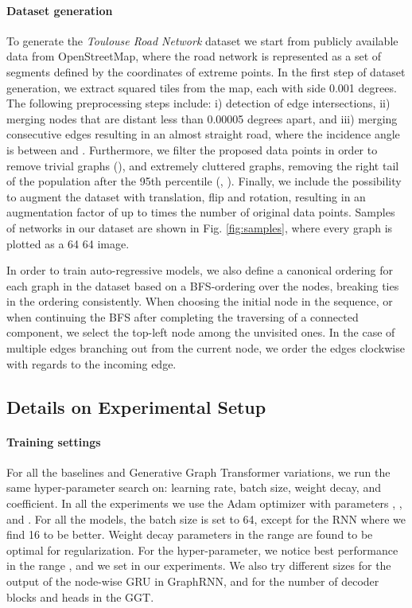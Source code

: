 \documentclass{article}
\begin{document}
\paragraph{Dataset generation}
To generate the \textit{Toulouse Road Network} dataset we start from publicly available data from OpenStreetMap, where the road network is represented as a set of segments defined by the coordinates of extreme points. In the first step of dataset generation, we extract squared tiles from the map, each with side 0.001 degrees. The following preprocessing steps include: i) detection of edge intersections, ii) merging nodes that are distant less than 0.00005 degrees apart, and iii) merging consecutive edges resulting in an almost straight road, where the incidence angle is between  and . Furthermore, we filter the proposed data points in order to remove trivial graphs (), and extremely cluttered graphs, removing the right tail of the population after the 95th percentile (, ). Finally, we include the possibility to augment the dataset with translation, flip and rotation, resulting in an augmentation factor of up to  times the number of original data points. Samples of networks in our dataset are shown in Fig. \ref{fig:samples}, where every graph is plotted as a 64  64 image.

In order to train auto-regressive models, we also define a canonical ordering for each graph in the dataset based on a BFS-ordering over the nodes, breaking ties in the ordering consistently. When choosing the initial node in the sequence, or when continuing the BFS after completing the traversing of a connected component, we select the top-left node among the unvisited ones. In the case of multiple edges branching out from the current node, we order the edges clockwise with regards to the incoming edge. 


\subsection{Details on Experimental Setup}
\label{app:experiments}

\paragraph{Training settings}
For all the baselines and Generative Graph Transformer variations, we run the same hyper-parameter search on: learning rate, batch size, weight decay, and  coefficient. In all the experiments we use the Adam optimizer \citep{kingma2014adam} with parameters ,  ,  and . For all the models, the batch size is set to 64, except for the RNN where we find 16 to be better. Weight decay parameters in the range  are found to be optimal for regularization. For the  hyper-parameter, we notice best performance in the range , and we set  in our experiments. We also try different sizes for the output of the node-wise GRU in GraphRNN, and for the number of decoder blocks and heads in the GGT.
\end{document}
